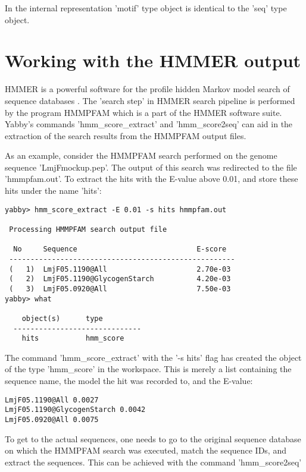 In the internal representation 'motif' type object is identical to
the 'seq' type object.

\section{Working with the HMMER output}


HMMER is a powerful software for the profile hidden Markov model
search of sequence databases \cite{hmmer,wwwhmmer}. The 'search 
step' in HMMER search pipeline is performed by the program
HMMPFAM which is a part of the HMMER software suite. Yabby's
commands 'hmm\_score\_extract' and 'hmm\_score2seq' can aid in the
extraction of the search results from the HMMPFAM output files.

As an example, consider the HMMPFAM search performed
on the genome sequence 'LmjFmockup.pep'. The output of this search
was redirected to the file 'hmmpfam.out'. To extract the hits
with the E-value above 0.01, and store these hits under the name
'hits':

\begin{verbatim}
yabby> hmm_score_extract -E 0.01 -s hits hmmpfam.out

 Processing HMMPFAM search output file

  No     Sequence                            E-score
 -----------------------------------------------------
 (   1)  LmjF05.1190@All                     2.70e-03
 (   2)  LmjF05.1190@GlycogenStarch          4.20e-03
 (   3)  LmjF05.0920@All                     7.50e-03
yabby> what

    object(s)      type
  ------------------------------
    hits           hmm_score     
\end{verbatim}

The command 'hmm\_score\_extract' with the '-s hits' flag has created
the object of the type 'hmm\_score' in the workspace. This is
merely a list containing the sequence name, the model the
hit was recorded to, and the E-value:

\begin{verbatim}
LmjF05.1190@All 0.0027
LmjF05.1190@GlycogenStarch 0.0042
LmjF05.0920@All 0.0075
\end{verbatim}

To get to the actual sequences, one needs to go to the
original sequence database on which the HMMPFAM search
was executed, match the sequence IDs, and extract the
sequences. This can be achieved with the command
'hmm\_score2seq'

